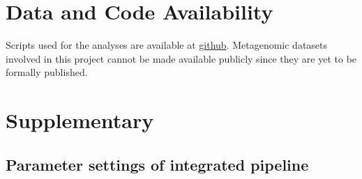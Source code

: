 \documentclass[11pt]{article}
\begin{document}


\section{Data and Code Availability}
Scripts used for the analyses are available at \href{https://github.com/CongLiu37/CMEECourseWork/tree/main/MResProject}{github}. 
Metagenomic datasets involved in this project cannot be made available publicly since they are yet to be formally published.

\newpage
  
  

\newpage

\newcommand{\beginsupplement}{%
        \setcounter{table}{0}
        \renewcommand{\thetable}{S\arabic{table}}%
        \setcounter{figure}{0}
        \renewcommand{\thefigure}{S\arabic{figure}}%
     }
\section{Supplementary}
  \beginsupplement
  \subsection{Parameter settings of integrated pipeline}
  \label{ParameterSetting}
\end{document}

